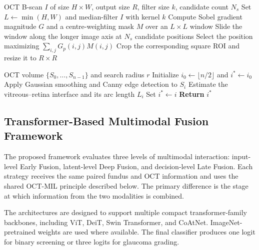 \documentclass[sn-mathphys]{sn-jnl}%
\theoremstyle{thmstyleone}%
\theoremstyle{thmstyletwo}%
\theoremstyle{thmstylethree}%
\begin{document}
\begin{algorithm}[!t]
    \caption{Weighted gradient-based OCT ROI selection}
    \label{alg:oct_roi}
    \begin{algorithmic}[1]
        \Require OCT B-scan $I$ of size $H\times W$, output size $R$, filter size $k$, candidate count $N_s$
        \State Set $L\leftarrow\min(H,W)$ and median-filter $I$ with kernel $k$
        \State Compute Sobel gradient magnitude $G$ and a centre-weighting mask $M$ over an $L\times L$ window
        \State Slide the window along the longer image axis at $N_s$ candidate positions
        \State Select the position maximizing $\sum_{i,j}G_p(i,j)M(i,j)$
        \State Crop the corresponding square ROI and resize it to $R\times R$
    \end{algorithmic}
\end{algorithm}

\begin{algorithm}[!t]
    \caption{Foveal-center slice estimation}
    \label{alg:foveal_detection}
    \begin{algorithmic}[1]
        \Require OCT volume $\{S_0,\ldots,S_{n-1}\}$ and search radius $r$
        \State Initialize $i_0\leftarrow\lfloor n/2\rfloor$ and $i^*\leftarrow i_0$
        \State Apply Gaussian smoothing and Canny edge detection to $S_i$
        \State Estimate the vitreous--retina interface and its arc length $L_i$
        \State Set $i^*\leftarrow i$
        \EndIf
        \EndFor
        \State \textbf{Return} $i^*$
    \end{algorithmic}
\end{algorithm}

\subsection{Transformer-Based Multimodal Fusion Framework}
\label{subsec:fusion_framework}

The proposed framework evaluates three levels of multimodal interaction: input-level Early Fusion, latent-level Deep Fusion, and decision-level Late Fusion. Each strategy receives the same paired fundus and OCT information and uses the shared OCT-MIL principle described below. The primary difference is the stage at which information from the two modalities is combined.

The architectures are designed to support multiple compact transformer-family backbones, including ViT, DeiT, Swin Transformer, and CoAtNet. ImageNet-pretrained weights are used where available. The final classifier produces one logit for binary screening or three logits for glaucoma grading.
\end{document}
